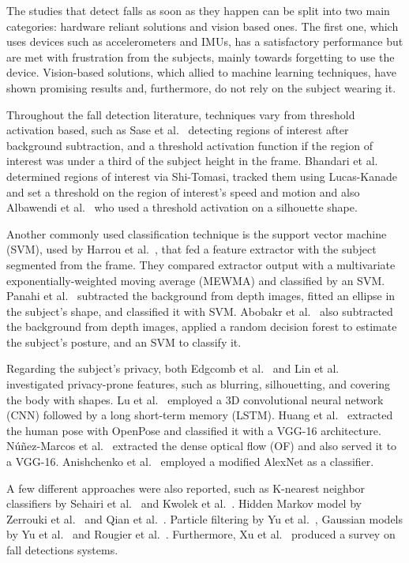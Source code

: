 \documentclass[10pt, conference, compsocconf]{IEEEtran}
\begin{document}
The studies that detect falls as soon as they happen can be split into two main categories: hardware reliant solutions and vision based ones. The first one, which uses devices such as accelerometers and IMUs, has a satisfactory performance but are met with frustration from the subjects, mainly towards forgetting to use the device. Vision-based solutions, which allied to machine learning techniques, have shown promising results and, furthermore, do not rely on the subject wearing it.

Throughout the fall detection literature, techniques vary from threshold activation based, such as Sase et al.~\cite{sase2018human} detecting regions of interest after background subtraction, and a threshold activation function if the region of interest was under a third of the subject height in the frame. Bhandari et al.~\cite{bhandari2017novel} determined regions of interest via Shi-Tomasi, tracked them using Lucas-Kanade and set a threshold on the region of interest's speed and motion and also Albawendi et al.~\cite{albawendi2018video} who used a threshold activation on a silhouette shape.

Another commonly used classification technique is the support vector machine (SVM), used by Harrou et al.~\cite{harrou2017vision}, that fed a feature extractor with the subject segmented from the frame. They compared extractor output with a multivariate exponentially-weighted moving average (MEWMA) and classified by an SVM. Panahi et al.~\cite{panahi2018human} subtracted the background from depth images, fitted an ellipse in the subject's shape, and classified it with SVM. Abobakr et al.~\cite{abobakr2017skeleton} also subtracted the background from depth images, applied a random decision forest to estimate the subject's posture, and an SVM to classify it.

Regarding the subject's privacy, both Edgcomb et al.~\cite{edgcomb2012automated} and Lin et al.~\cite{lin2013fall} investigated privacy-prone features, such as blurring, silhouetting, and covering the body with shapes. Lu et al.~\cite{lu2018deep} employed a 3D convolutional neural network (CNN) followed by a long short-term memory (LSTM). Huang et al.~\cite{huang2018video} extracted the human pose with OpenPose and classified it with a VGG-16 architecture. N\'u\~nez-Marcos et al.~\cite{nunez2017vision} extracted the dense optical flow (OF) and also served it to a VGG-16. Anishchenko et al.~\cite{anishchenko2018machine} employed a modified AlexNet as a classifier.

A few different approaches were also reported, such as K-nearest neighbor classifiers by Sehairi et al.~\cite{sehairi2018elderly} and Kwolek et al.~\cite{kwolek2015improving}. Hidden Markov model by Zerrouki et al.~\cite{zerrouki2018combined} and Qian et al.~\cite{qian2017recognizing}. Particle filtering by Yu et al.~\cite{yu2009fall}, Gaussian models by Yu et al.~\cite{yu2010robust} and Rougier et al.~\cite{rougier2011robust}. Furthermore, Xu et al.~\cite{xu2018new} produced a survey on fall detections systems.
\end{document}
